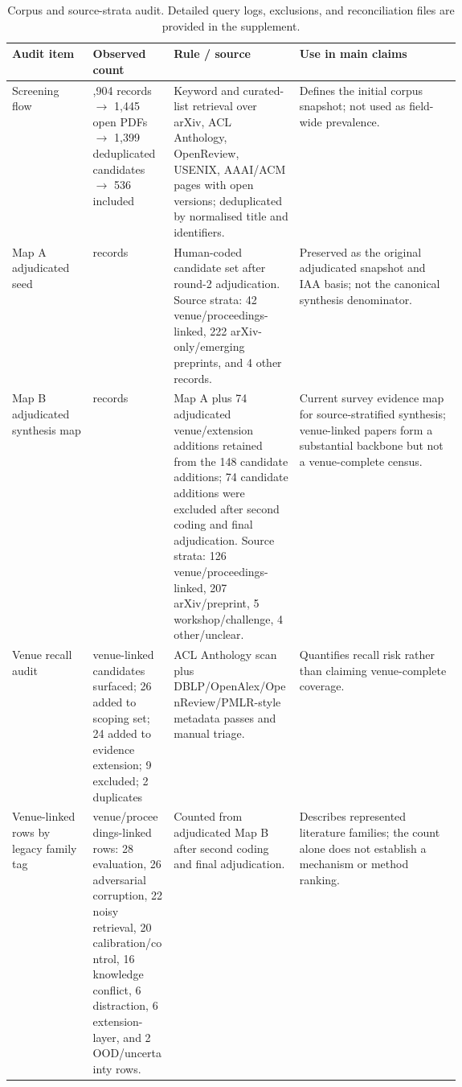 \begin{table}[t]
\centering
\scriptsize
\renewcommand{\arraystretch}{0.88}
\begin{tabularx}{\linewidth}{>{\raggedright\arraybackslash}p{0.18\linewidth}>{\raggedright\arraybackslash}p{0.18\linewidth}>{\raggedright\arraybackslash}p{0.29\linewidth}X}
\toprule
\textbf{Audit item} & \textbf{Observed count} & \textbf{Rule / source} & \textbf{Use in main claims} \\
\midrule
Screening flow & 1,904 records $\rightarrow$ 1,445 open PDFs $\rightarrow$ 1,399 deduplicated candidates $\rightarrow$ 536 included & Keyword and curated-list retrieval over arXiv, ACL Anthology, OpenReview, USENIX, AAAI/ACM pages with open versions; deduplicated by normalised title and identifiers. & Defines the initial corpus snapshot; not used as field-wide prevalence. \\
Map A adjudicated seed & 268 records & Human-coded candidate set after round-2 adjudication. Source strata: 42 venue/proceedings-linked, 222 arXiv-only/emerging preprints, and 4 other records. & Preserved as the original adjudicated snapshot and IAA basis; not the canonical synthesis denominator. \\
Map B adjudicated synthesis map & 342 records & Map A plus 74 adjudicated venue/extension additions retained from the 148 candidate additions; 74 candidate additions were excluded after second coding and final adjudication. Source strata: 126 venue/proceedings-linked, 207 arXiv/preprint, 5 workshop/challenge, 4 other/unclear. & Current survey evidence map for source-stratified synthesis; venue-linked papers form a substantial backbone but not a venue-complete census. \\
Venue recall audit & 51 venue-linked candidates surfaced; 26 added to scoping set; 24 added to evidence extension; 9 excluded; 2 duplicates & ACL Anthology scan plus DBLP/OpenAlex/OpenReview/PMLR-style metadata passes and manual triage. & Quantifies recall risk rather than claiming venue-complete coverage. \\
Venue-linked rows by legacy family tag & 126 venue/proceedings-linked rows: 28 evaluation, 26 adversarial corruption, 22 noisy retrieval, 20 calibration/control, 16 knowledge conflict, 6 distraction, 6 extension-layer, and 2 OOD/uncertainty rows. & Counted from adjudicated Map B after second coding and final adjudication. & Describes represented literature families; the count alone does not establish a mechanism or method ranking. \\
\bottomrule
\end{tabularx}
\caption{Corpus and source-strata audit. Detailed query logs, exclusions, and reconciliation files are provided in the supplement.}
\label{tab:main-corpus-audit}
\end{table}
